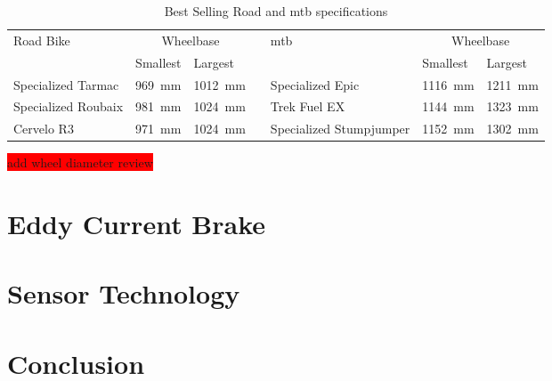 \begin{table}[ht]
	\renewcommand{\arraystretch}{1.2}
	\centering
	\caption{Best Selling Road and \ac{mtb} specifications}
	\begin{tabularx}{\textwidth}{p{2.6cm} X Xp{0.05cm} p{2.6cm} X X}
		\toprule
		Road Bike           & \multicolumn{2}{c}{Wheelbase} &                         & \ac{mtb} & \multicolumn{2}{c}{Wheelbase}                                                     \\
		                    & Smallest                      & Largest                 &          &                               & Smallest                & Largest                 \\
		\midrule
		Specialized Tarmac  & \SI{969}{\milli\meter}        & \SI{1012}{\milli\meter} &          & Specialized Epic              & \SI{1116}{\milli\meter} & \SI{1211}{\milli\meter} \\
		Specialized Roubaix & \SI{981}{\milli\meter}        & \SI{1024}{\milli\meter} &          & Trek Fuel EX                  & \SI{1144}{\milli\meter} & \SI{1323}{\milli\meter} \\
		Cervelo R3          & \SI{971}{\milli\meter}        & \SI{1024}{\milli\meter} &          & Specialized Stumpjumper       & \SI{1152}{\milli\meter} & \SI{1302}{\milli\meter} \\
		\bottomrule
	\end{tabularx}
	\label{tab:bikes}
\end{table}

\colorbox{red}{add wheel diameter review}

\newpage

\section{Eddy Current Brake}

\newpage

\section{Sensor Technology}

\newpage

\section{Conclusion}
